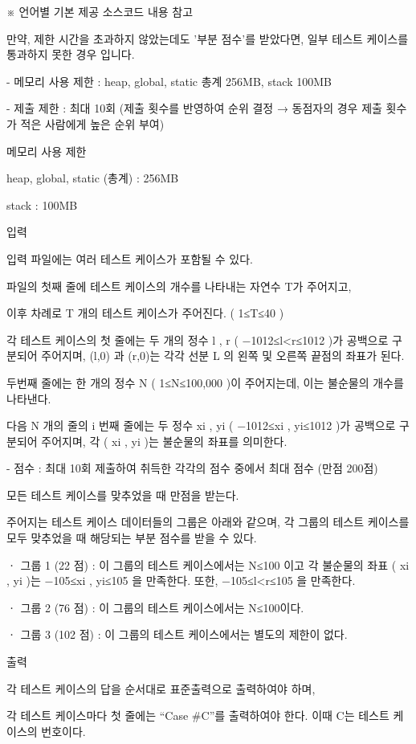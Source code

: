 \documentclass [12pt] {oblivoir}
\begin{document}
※ 언어별 기본 제공 소스코드 내용 참고

만약, 제한 시간을 초과하지 않았는데도 '부분 점수'를 받았다면, 일부 테스트 케이스를 통과하지 못한 경우 입니다.

- 메모리 사용 제한 : heap, global, static 총계 256MB, stack 100MB

- 제출 제한 : 최대 10회 (제출 횟수를 반영하여 순위 결정 → 동점자의 경우 제출 횟수가 적은 사람에게 높은 순위 부여)

메모리 사용 제한

heap, global, static (총계) : 256MB

stack : 100MB

입력

입력 파일에는 여러 테스트 케이스가 포함될 수 있다.

파일의 첫째 줄에 테스트 케이스의 개수를 나타내는 자연수 T가 주어지고,

이후 차례로  T 개의 테스트 케이스가 주어진다. ( 1≤T≤40 )

각 테스트 케이스의 첫 줄에는 두 개의 정수 l , r ( −1012≤l<r≤1012 )가 공백으로 구분되어 주어지며, (l,0) 과 (r,0)는 각각 선분 L 의 왼쪽 및 오른쪽 끝점의 좌표가 된다.

두번째 줄에는 한 개의 정수 N ( 1≤N≤100,000 )이 주어지는데, 이는 불순물의 개수를 나타낸다.

다음 N 개의 줄의 i 번째 줄에는 두 정수 xi , yi  ( −1012≤xi , yi≤1012 )가 공백으로 구분되어 주어지며, 각 ( xi , yi )는 불순물의 좌표를 의미한다.

- 점수 : 최대 10회 제출하여 취득한 각각의 점수 중에서 최대 점수 (만점 200점)

모든 테스트 케이스를 맞추었을 때 만점을 받는다.

주어지는 테스트 케이스 데이터들의 그룹은 아래와 같으며, 각 그룹의 테스트 케이스를 모두 맞추었을 때 해당되는 부분 점수를 받을 수 있다.

   ㆍ 그룹 1 (22 점) : 이 그룹의 테스트 케이스에서는 N≤100 이고 각 불순물의 좌표 ( xi , yi )는 −105≤xi , yi≤105 을 만족한다. 또한, −105≤l<r≤105 을 만족한다.

   ㆍ 그룹 2 (76 점) : 이 그룹의 테스트 케이스에서는 N≤100이다.

   ㆍ 그룹 3 (102 점) : 이 그룹의 테스트 케이스에서는 별도의 제한이 없다.

출력

각 테스트 케이스의 답을 순서대로 표준출력으로 출력하여야 하며,

각 테스트 케이스마다 첫 줄에는 “Case \#C”를 출력하여야 한다. 이때 C는 테스트 케이스의 번호이다.
\end{document}
